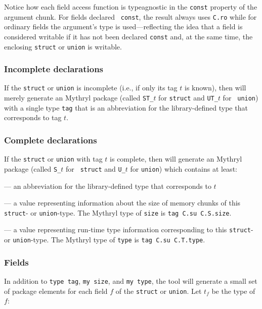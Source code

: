 \noindent Notice how each field access function is typeagnostic in the
{\tt const} property of the argument chunk.  For fields declared {\tt
  const}, the result always uses {\tt C.ro} while for ordinary fields
the argument's type is used---reflecting the idea that a field is
considered writable if it has not been declared {\tt const} and, at
the same time, the enclosing {\tt struct} or {\tt union} is writable.

\subsubsection*{Incomplete declarations}

If the {\tt struct} or {\tt union} is incomplete (i.e., if only its
tag $t$ is known), then {\cgluemaker} will merely generate an Mythryl package
(called {\tt ST\_$t$} for {\tt struct} and {\tt UT\_$t$} for {\tt
  union}) with a single type {\tt tag} that is an abbreviation for the
library-defined type that corresponds to tag $t$.

\subsubsection*{Complete declarations}

If the {\tt struct} or {\tt union} with tag $t$ is complete, then
{\cgluemaker} will generate an Mythryl package (called {\tt S\_$t$} for {\tt
  struct} and {\tt U\_$t$} for {\tt union}) which contains at least:
\begin{description}\setlength{\itemsep}{0pt}
\item[{\tt type tag}] --- an abbreviation for the library-defined type
  that corresponds to $t$
\item[{\tt my size}] --- a value representing information about the
  size of memory chunks of this {\tt struct}- or {\tt union}-type.
  The Mythryl type of {\tt size} is {\tt tag C.su C.S.size}.
\item[{\tt my type}] --- a value representing run-time type
  information corresponding to this {\tt struct}- or {\tt union}-type.
  The Mythryl type of {\tt type} is {\tt tag C.su C.T.type}.
\end{description}

\subsubsection*{Fields}

In addition to {\tt type tag}, {\tt my size}, and {\tt my type}, the
{\cgluemaker} tool will generate a small set of package elements for
each field $f$ of the {\tt struct} or {\tt union}.  Let $t_f$ be the
type of $f$:

